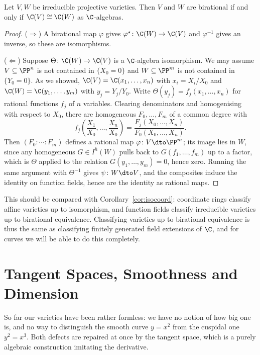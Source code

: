 \begin{theorem}\label{thm:biratfield}
	Let $V, W$ be irreducible projective varieties. Then $V$ and $W$ are birational if and only if $\C(V) \cong \C(W)$ as $\C$-algebras.
\end{theorem}

\begin{proof}
	($\Rightarrow$) A birational map $\varphi$ gives $\varphi^\star \colon \C(W) \to \C(V)$ and $\varphi^{-1}$ gives an inverse, so these are isomorphisms.

	($\Leftarrow$) Suppose $\Theta \colon \C(W) \to \C(V)$ is a $\C$-algebra isomorphism. We may assume $V \subseteq \PP^n$ is not contained in $\{X_0 = 0\}$ and $W\subseteq\PP^m$ is not contained in $\{Y_0=0\}$. As we showed, $\C(V) = \C(x_1,\dots,x_n)$ with $x_i = X_i/X_0$ and $\C(W) = \C(y_1,\dots,y_m)$ with $y_j = Y_j/Y_0$. Write $\Theta(y_j) = f_j(x_1,\dots,x_n)$ for rational functions $f_j$ of $n$ variables. Clearing denominators and homogenising with respect to $X_0$, there are homogeneous $F_0,\dots,F_m$ of a common degree with
	$$f_j\left(\frac{X_1}{X_0},\dots,\frac{X_n}{X_0}\right) = \frac{F_j(X_0,\dots,X_n)}{F_0(X_0,\dots,X_n)}.$$
	Then $(F_0:\cdots:F_m)$ defines a rational map $\varphi \colon V \dto \PP^m$; its image lies in $W$, since any homogeneous $G \in I^h(W)$ pulls back to $G(f_1,\dots,f_m)$ up to a factor, which is $\Theta$ applied to the relation $G(y_1,\dots,y_m) = 0$, hence zero. Running the same argument with $\Theta^{-1}$ gives $\psi \colon W \dto V$, and the composites induce the identity on function fields, hence are the identity as rational maps.
\end{proof}

This should be compared with Corollary~\ref{cor:isocoord}: coordinate rings classify affine varieties up to isomorphism, and function fields classify irreducible varieties up to birational equivalence. Classifying varieties up to birational equivalence is thus the same as classifying finitely generated field extensions of $\C$, and for curves we will be able to do this completely.

\section{Tangent Spaces, Smoothness and Dimension}\label{sec:tangent}

So far our varieties have been rather formless: we have no notion of how big one is, and no way to distinguish the smooth curve $y = x^2$ from the cuspidal one $y^2 = x^3$. Both defects are repaired at once by the tangent space, which is a purely algebraic construction imitating the derivative.

